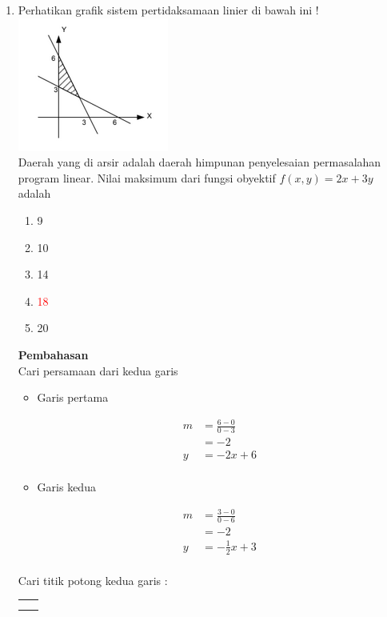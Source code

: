\documentclass{report}
\newcommand{\options}[5]{
\begin{enumerate}[label=\alph*.]
	\item #1
	\item #2
	\item #3
	\item #4
	\item #5
\end{enumerate}
}
\newcommand{\pemb}{ \textbf{Pembahasan} \\}
\begin{document}
\begin{enumerate}
\item Perhatikan grafik sistem pertidaksamaan linier di bawah ini ! \\
\includegraphics{graf_pertidak.png} \\
Daerah yang di arsir adalah daerah himpunan penyelesaian permasalahan program linear. Nilai maksimum dari fungsi obyektif $f(x,y) = 2x+3y$ adalah
\options
{9}
{10}
{14}
{\textcolor{red}{18}}
{20}
\pemb
Cari persamaan dari kedua garis\\
\begin{itemize}
	\item Garis pertama \\
	\begin{align*}
		m&=\frac{6-0}{0-3}\\
		&=-2\\
		y&=-2x+6\\
	\end{align*}
	\item Garis kedua
	\begin{align*}
		m&=\frac{3-0}{0-6}\\
		&=-2\\
		y&=-\frac{1}{2}x+3\\
	\end{align*}
\end{itemize}
Cari titik potong kedua garis :
	\begin{center}
	\begin{tabular}{c}
		\parbox{3cm}{
			\begin{align*}

\end{align*}}
\end{tabular}
\end{center}
\end{enumerate}
\end{document}
